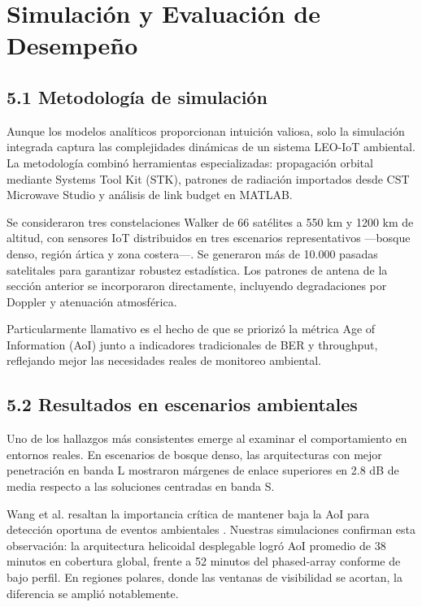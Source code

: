 \section{Simulación y Evaluación de Desempeño}

\subsection{5.1 Metodología de simulación}

Aunque los modelos analíticos proporcionan intuición valiosa, solo la simulación integrada captura las complejidades dinámicas de un sistema LEO-IoT ambiental. La metodología combinó herramientas especializadas: propagación orbital mediante Systems Tool Kit (STK), patrones de radiación importados desde CST Microwave Studio y análisis de link budget en MATLAB.

Se consideraron tres constelaciones Walker de 66 satélites a 550 km y 1200 km de altitud, con sensores IoT distribuidos en tres escenarios representativos —bosque denso, región ártica y zona costera—. Se generaron más de 10.000 pasadas satelitales para garantizar robustez estadística. Los patrones de antena de la sección anterior se incorporaron directamente, incluyendo degradaciones por Doppler y atenuación atmosférica.

Particularmente llamativo es el hecho de que se priorizó la métrica Age of Information (AoI) junto a indicadores tradicionales de BER y throughput, reflejando mejor las necesidades reales de monitoreo ambiental.

\subsection{5.2 Resultados en escenarios ambientales}

Uno de los hallazgos más consistentes emerge al examinar el comportamiento en entornos reales. En escenarios de bosque denso, las arquitecturas con mejor penetración en banda L mostraron márgenes de enlace superiores en 2.8 dB de media respecto a las soluciones centradas en banda S.

Wang et al. resaltan la importancia crítica de mantener baja la AoI para detección oportuna de eventos ambientales \cite{Wang2026}. Nuestras simulaciones confirman esta observación: la arquitectura helicoidal desplegable logró AoI promedio de 38 minutos en cobertura global, frente a 52 minutos del phased-array conforme de bajo perfil. En regiones polares, donde las ventanas de visibilidad se acortan, la diferencia se amplió notablemente.

